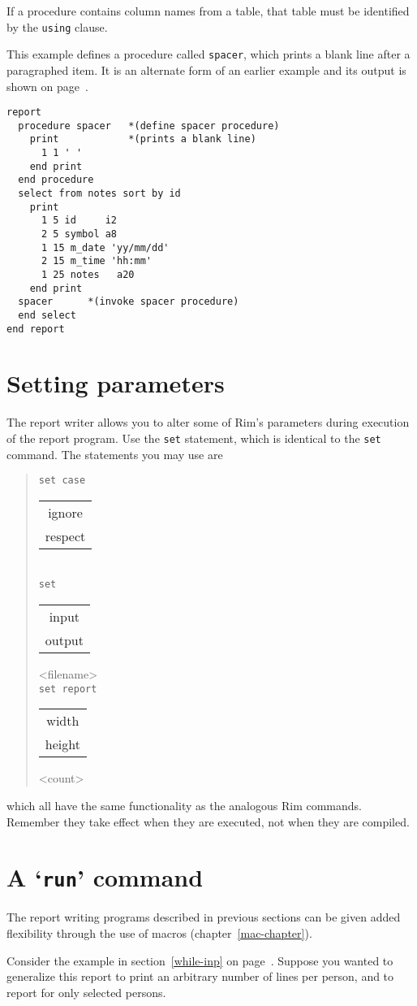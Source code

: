 \documentclass[11pt,a4paper]{report}
\def\stk#1{\begin{tabular}[c]{c}#1\end{tabular}}
\def\I{\index}
\begin{document}
If a procedure contains column names from a table,
that table must be identified by the \verb!using! clause.
 
 
\demobreak
This example defines a procedure called \verb!spacer!, which prints a blank
line after a paragraphed item.
It is an alternate form of an earlier example and
its output is shown on
page~\pageref{para-demo}.
\demobreak
\begin{verbatim}
report
  procedure spacer   *(define spacer procedure)
    print            *(prints a blank line)
      1 1 ' '
    end print
  end procedure
  select from notes sort by id
    print
      1 5 id     i2
      2 5 symbol a8
      1 15 m_date 'yy/mm/dd'
      2 15 m_time 'hh:mm'
      1 25 notes   a20
    end print
  spacer      *(invoke spacer procedure)
  end select
end report
\end{verbatim}
 
 
\section{Setting parameters}
%
\I{set statement}
The report writer allows you to alter some of Rim's parameters
during execution of the report program.
Use the \verb!set! statement, which is identical to the
\verb!set! command.  The statements you may use are
\begin{verse}
  \verb!set case! \stk{ignore\\respect} \\
  \verb!set! \stk{input\\output} <filename> \\
  \verb!set report! \stk{width\\height} <count>
\end{verse}
which all have the same functionality as the analogous Rim commands.
Remember they take effect when they are executed, not when
they are compiled.
 
 
\section{A `{\tt run}' command}
\I{run@"run"}
\I{macros}
\label{run-mac}
The report writing programs described in previous sections
can be given added flexibility through the use of macros
(chapter~\ref{mac-chapter}).
 
Consider the example in section~\ref{while-inp}
on page~\pageref{while-inp}.
Suppose you wanted to generalize this report to print
an arbitrary number of lines per person, and
to report for only selected persons.
 
\end{document}
